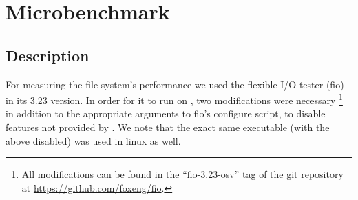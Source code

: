\section{Microbenchmark}

\subsection{Description}

For measuring the file system's performance we used the flexible I/O tester
(fio) \cite{fio} in its 3.23 version. In order for it to run on \osv{}, two
modifications were necessary%
\footnote{All modifications can be found in the ``fio-3.23-osv'' tag of the git
repository at \url{https://github.com/foxeng/fio}.}
in addition to the appropriate arguments to fio's configure script, to disable
features not provided by \osv{}. We note that the exact same executable (with
the above disabled) was used in linux as well.

